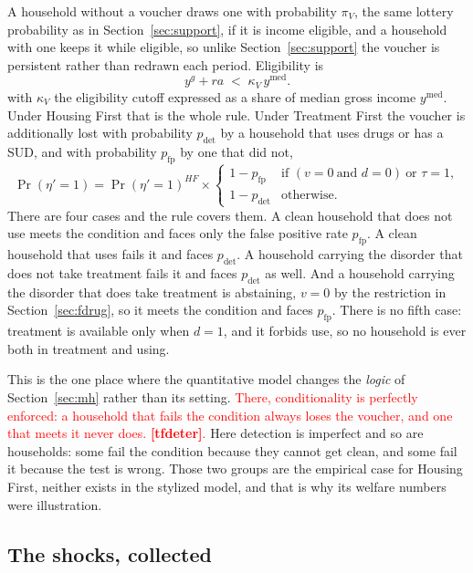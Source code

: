 \documentclass[10pt]{article}
\begin{document}
A household without a voucher draws one with probability $\pi_V$, the same
lottery probability as in Section~\ref{sec:support}, if it is income
eligible, and a household with one keeps it while eligible, so unlike
Section~\ref{sec:support} the voucher is persistent rather than redrawn each
period. Eligibility is
\begin{equation}\label{eq:felig}
y^{g}+ra\;<\;\kappa_V\,y^{\text{med}}.
\end{equation}
with $\kappa_V$ the eligibility cutoff expressed as a share of
median gross income $y^{\text{med}}$.
Under Housing First that is the whole rule. Under Treatment First the voucher is
additionally lost with probability $p_{\text{det}}$ by a household that uses
drugs or has a SUD, and
with probability $p_{\text{fp}}$ by one that did not,
\begin{equation}\label{eq:fpol}
\Pr(\eta'=1)=\Pr(\eta'=1)^{HF}\times
\begin{cases}
1-p_{\text{fp}} & \text{if } (v=0 \ \text{and } d=0) \ \text{or } \tau=1,\\
1-p_{\text{det}} & \text{otherwise} .
\end{cases}
\end{equation}
There are four cases and the rule covers them. A clean household that does
not use meets the condition and faces only the false positive rate $p_{\text{fp}}$.
A clean household that uses fails it and faces $p_{\text{det}}$. A household
carrying the disorder that does not take treatment fails it and faces
$p_{\text{det}}$ as well. And a household carrying the disorder that does take
treatment is abstaining, $v=0$ by the restriction in
Section~\ref{sec:fdrug}, so it meets the condition and faces $p_{\text{fp}}$.
There is no fifth case: treatment is available only when $d=1$, and it forbids
use, so no household is ever both in treatment and using.

This is the one place where the quantitative model changes the \emph{logic} of
Section~\ref{sec:mh} rather than its setting. \textcolor{red}{There, conditionality is perfectly
enforced: a household that fails the condition always loses the voucher, and one
that meets it never does. \textbf{[tfdeter]}.} Here detection is imperfect and so are households: some fail
the condition because they cannot get clean, and some fail it because the test is
wrong. Those two groups are the empirical case for Housing First, neither exists
in the stylized model, and that is why its welfare numbers were illustration.

\subsection{The shocks, collected}\label{sec:fshocks}
\end{document}
